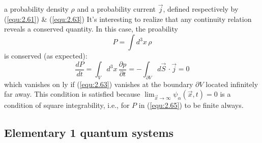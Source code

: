 a probability density $\rho$ and a probability current
$\vec{j}$, defined respectively by (\ref{equ:2.61}) \&
(\ref{equ:2.63})
It's interesting to realize that any continuity relation
reveals a conserved quantity. In this case, the proability
\begin{equation}
  P = \int d^3x \, \rho
  \label{equ:2.65}
\end{equation}
is conserved (as expected):
\begin{equation}
  \frac{dP}{dt} = \int_{V} d^3 x \, \frac{\partial
  p}{\partial t} = - \int_{\partial V} d\vec{S} \, \cdot
  \vec{j} = 0
  \label{equ:2.66}
\end{equation}
which vanishes on ly if (\ref{equ:2.63}) vanishes at the
boundary $\partial V$ located infinitely far away. This
condition is satisfied because \(\displaystyle \lim_{\vec{x}
\to \infty} \psi_{\alpha}(\vec{x},t)  = 0\) is a condition
of square integrability, i.e., for $P$ in (\ref{equ:2.65})
to be finite always.
\subsection{Elementary 1 quantum systems}

